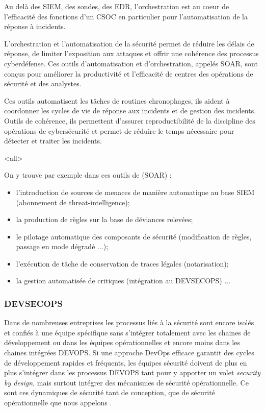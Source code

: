 Au delà des SIEM, des sondes, des EDR, l'orchestration est au coeur de l'efficacité des fonctions d'un CSOC en particulier pour l'automatisation de la réponse à incidents.

L'orchestration et l'automatisation de la sécurité  permet de réduire les délais de réponse, de  limiter l'exposition aux attaques et offrir une cohérence des processus cyberdéfense. Ces  outils d’automatisation et d’orchestration,  appelés SOAR, sont conçus pour améliorer la productivité et l’efficacité de centres des opérations de sécurité et des analystes.

Ces outils automatisent les tâches de routines chronophages,  ils aident à coordonner les cycles de vie de réponse aux incidents et de gestion des incidents. Outils de  cohérence, ils permettent d'assurer reproductibilité de la discipline des opérations de cybersécurité et permet de réduire le temps nécessaire pour détecter et traiter les incidents.


\mode<all>{
{
On y trouve par exemple dans ces outils de   (SOAR) :
\begin{itemize}
  \item l'introduction de sources de menaces de manière automatique au base SIEM (abonnement de threat-intelligence);
  \item la production de règles sur la base de déviances relevées;
  \item le pilotage automatique des composants de sécurité (modification de règles, passage en mode dégradé ...);
  \item l'exécution de tâche de conservation de traces légales (notarisation);
  \item la gestion automatisée de  critiques (intégration au DEVSECOPS) ...
\end{itemize}
}} %



\subsubsection{DEVSECOPS}

Dans de nombreuses entreprises les processus liés à la sécurité sont encore isolés et confiés à une équipe spécifique sans s'intégrer totalement avec les chaines de développement ou dans les équipes opérationnelles et encore moins dans les chaines intégrées DEVOPS. 
 Si une approche DevOps efficace garantit des cycles de développement rapides et fréquents, les équipes sécurité doivent de plus en plus s'intégrer dans les processus DEVOPS tant pour y apporter un volet \textit{security by design}, mais surtout intégrer des mécanismes de sécurité opérationnelle.
 Ce sont ces dynamiques de sécurité tant de conception, que de sécurité opérationnelle que nous appelons .
 
